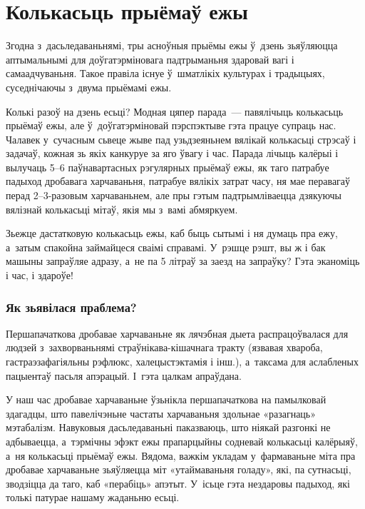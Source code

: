\chapter{Колькасьць прыёмаў ежы}

Згодна з~дасьледаваньнямі, тры асноўныя прыёмы ежы ў~дзень зьяўляюцца аптымальнымі для доўгатэрміновага падтрыманьня здаровай вагі і самаадчуваньня. Такое правіла існуе ў~шматлікіх культурах і традыцыях, суседнічаючы з~двума прыёмамі ежы.

Колькі разоў на дзень есьці? Модная цяпер парада~--- павялічыць колькасьць прыёмаў ежы, але ў~доўгатэрміновай пэрспэктыве гэта працуе супраць нас. Чалавек у~сучасным сьвеце жыве пад узьдзеяньнем вялікай колькасьці стрэсаў і задачаў, кожная зь якіх канкуруе за яго ўвагу і час. Парада лічыць калёрыі і вылучаць 5--6 паўнавартасных рэгулярных прыёмаў ежы, як таго патрабуе падыход дробавага харчаваньня, патрабуе вялікіх затрат часу, ня мае перавагаў перад 2--3-разовым харчаваньнем, але пры гэтым падтрымліваецца дзякуючы вялізнай колькасьці мітаў, якія мы з~вамі абмяркуем.


Зьежце дастатковую колькасьць ежы, каб быць сытымі і ня думаць пра ежу, а~затым спакойна займайцеся сваімі справамі. У~рэшце рэшт, вы ж і бак машыны запраўляе адразу, а~не па 5 літраў за заезд на запраўку? Гэта эканоміць і час, і здароўе!

\subsection{Як зьявілася праблема?}

Першапачаткова дробавае харчаваньне як лячэбная дыета распрацоўвалася для людзей з~захворваньнямі страўнікава-кішачнага тракту (язвавая хвароба, гастраэзафагіяльны рэфлюкс, халецыстэктамія і інш.), а~таксама для аслабленых пацыентаў пасьля апэрацый. І~гэта цалкам апраўдана.

У наш час дробавае харчаваньне ўзьнікла першапачаткова на памылковай здагадцы, што павелічэньне частаты харчаваньня здольнае «разагнаць» мэтабалізм. Навуковыя дасьледаваньні паказваюць, што ніякай разгонкі не адбываецца, а~тэрмічны эфэкт ежы прапарцыйны содневай колькасьці калёрыяў, а~ня колькасьці прыёмаў ежы. Вядома, важкім укладам у~фармаваньне міта пра дробавае харчаваньне зьяўляецца міт «утаймаваньня голаду», які, па сутнасьці, зводзіцца да таго, каб «перабіць» апэтыт. У~ісьце гэта нездаровы падыход, які толькі патурае нашаму жаданьню есьці.


